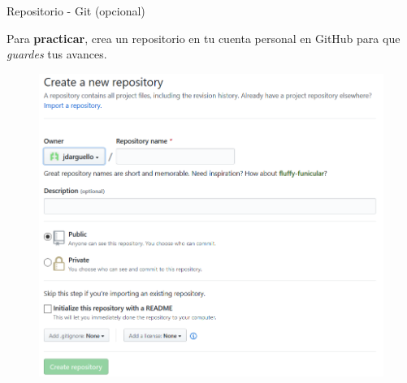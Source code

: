 \begin{frame}[t]{Repositorio - Git (opcional)}\vspace{10pt}

Para \textbf{practicar}, crea un repositorio en tu cuenta personal en GitHub para que \textit{guardes} tus avances.

\begin{figure}
	\includegraphics[scale=0.5]{Images/Repositorio.PNG}
\end{figure}

\end{frame}